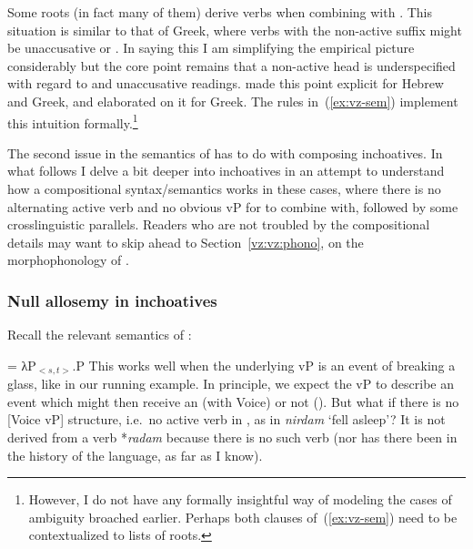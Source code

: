 \begin{exe}
\begin{xlist}
\begin{xlist}
\begin{exe}
\begin{xlist}
\begin{xlist}
\begin{exe}
\begin{xlist}
\begin{xlist}
\begin{exe}
\begin{exe}
\begin{xlist}
\begin{exe}
\begin{exe}
\begin{xlist}
\begin{exe}
\begin{exe}
\begin{exe}
\begin{exe}
\begin{exe}
\begin{xlist}
\begin{exe}
\begin{xlist}
\begin{exe}
\begin{exe}
\begin{xlist}
\begin{exe}
\begin{xlist}
\begin{exe}
\begin{xlist}
\begin{exe}
\begin{exe}
\begin{exe}
\begin{xlist}
Some roots (in fact many of them) derive  verbs when combining with {\tnif}. This situation is similar to that of Greek, where verbs with the non-active suffix might be unaccusative or . In saying this I am simplifying the empirical picture considerably but the core point remains that a non-active head is underspecified with regard to  and unaccusative readings. \cite{alexiadoudoron12} made this point explicit for Hebrew and Greek, and \cite{layering15} elaborated on it for Greek. The rules in~(\ref{ex:vz-sem}) implement this intuition formally.\footnote{However, I do not have any formally insightful way of modeling the cases of ambiguity broached earlier. Perhaps both clauses of~(\ref{ex:vz-sem}) need to be contextualized to lists of roots.}

The second issue in the semantics of {\vz} has to do with composing inchoatives. In what follows I delve a bit deeper into inchoatives in an attempt to understand how a compositional syntax/semantics works in these cases, where there is no alternating active verb and no obvious vP for {\vz} to combine with, followed by some crosslinguistic parallels. Readers who are not troubled by the compositional details may want to skip ahead to Section~\ref{vz:vz:phono}, on the morphophonology of {\vz}.

\subsubsection{Null allosemy in inchoatives} \label{vz:inch:analysis}
Recall the relevant semantics of {\vz}:
 \begin{exe}
\ex  \denote{\vz} = λP$_{<s,t>}$.P
 \z 
This works well when the underlying vP is an event of breaking a glass, like in our running example. In principle, we expect the vP to describe an event which might then receive an  (with Voice) or not ({\vz}). But what if there is no [Voice vP] structure, i.e.~no active verb in {\tkal}, as in \emph{nirdam} `fell asleep'? It is not derived from a  verb *\emph{radam} because there is no such verb (nor has there been in the history of the language, as far as I know).


\end{exe}
\end{xlist}
\end{exe}
\end{exe}
\end{exe}
\end{xlist}
\end{exe}
\end{xlist}
\end{exe}
\end{xlist}
\end{exe}
\end{exe}
\end{xlist}
\end{exe}
\end{xlist}
\end{exe}
\end{exe}
\end{exe}
\end{exe}
\end{exe}
\end{xlist}
\end{exe}
\end{exe}
\end{xlist}
\end{exe}
\end{exe}
\end{xlist}
\end{xlist}
\end{exe}
\end{xlist}
\end{xlist}
\end{exe}
\end{xlist}
\end{xlist}
\end{exe}
